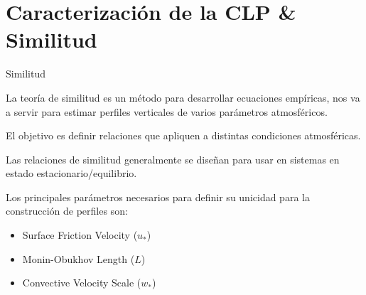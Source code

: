 %
\section{Caracterización de la CLP \& Similitud}

\begin{frame}{Similitud}

La teoría de similitud es un método para desarrollar ecuaciones empíricas, nos va a servir para estimar perfiles verticales de varios parámetros atmosféricos. %

El objetivo es definir relaciones que apliquen a distintas condiciones atmosféricas. %

Las relaciones de similitud generalmente se diseñan para usar en sistemas en estado estacionario/equilibrio. %

    
Los principales parámetros necesarios para definir su unicidad para la construcción de perfiles son: %
\begin{itemize}
    \item Surface Friction Velocity ($u_*$)
    \item Monin-Obukhov Length ($L$)
    \item Convective Velocity Scale ($w_*$)
\end{itemize}
\end{frame}


